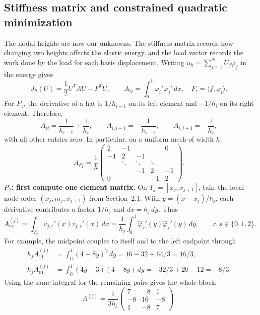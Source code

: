 \documentclass[11pt,a4paper]{article}
\newcommand{\ip}[2]{\langle #1,#2\rangle}
\newcommand{\subsect}[1]{\Needspace{5\baselineskip}\subsection{#1}}
\begin{document}
\subsect{Stiffness matrix and constrained quadratic minimization}
The nodal heights are now our unknowns. The stiffness matrix records how
changing two heights affects the elastic energy, and the load vector records
the work done by the load for each basis displacement. Writing $u_h=\sum_{j=1}^N U_j\varphi_j$ in the energy gives
\[
 J_h(U)=\frac12U^TAU-F^TU,\qquad
 A_{ij}=\int_0^1\varphi_i'\varphi_j'\,dx,\quad F_i=\ip{f}{\varphi_i}.
\]
For $P_1$, the derivative of a hat is $1/h_{i-1}$ on its left element and $-1/h_i$ on its right element. Therefore,
\[
 A_{ii}=\frac1{h_{i-1}}+\frac1{h_i},\qquad
 A_{i,i-1}=-\frac1{h_{i-1}},\qquad
 A_{i,i+1}=-\frac1{h_i},
\]
with all other entries zero. In particular, on a uniform mesh of width $h$,
\[
 A_{P_1}=\frac1h
 \begin{pmatrix}
 2&-1& & &0\\
 -1&2&-1& & \\
 &\ddots&\ddots&\ddots& \\
 & &-1&2&-1\\
 0& & &-1&2
 \end{pmatrix}.
\]
\textbf{$P_2$: first compute one element matrix.}
On $T_j=[x_j,x_{j+1}]$, take the local node order $(x_j,m_j,x_{j+1})$ from Section~2.1. With $y=(x-x_j)/h_j$, each derivative contributes a factor $1/h_j$ and $dx=h_j\,dy$. Thus
\[
 A^{(j)}_{rs}=\int_{T_j}v_{j,r}'(x)v_{j,s}'(x)\,dx
 =\frac1{h_j}\int_0^1\widehat\varphi_r'(y)\widehat\varphi_s'(y)\,dy,
 \qquad r,s\in\{0,1,2\}.
\]
For example, the midpoint couples to itself and to the left endpoint through
\[
 \begin{aligned}
 h_j A^{(j)}_{11}&=\int_0^1(4-8y)^2\,dy
     =16-32+64/3=16/3,\\
 h_j A^{(j)}_{01}&=\int_0^1(4y-3)(4-8y)\,dy
     =-32/3+20-12=-8/3 .
 \end{aligned}
\]
Using the same integral for the remaining pairs gives the whole block:
\[
 A^{(j)}=\frac1{3h_j}
 \begin{pmatrix}7&-8&1\\-8&16&-8\\1&-8&7\end{pmatrix}.
\]
\end{document}
